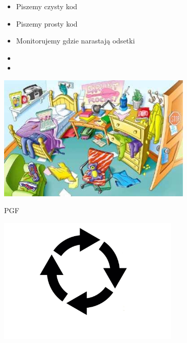 \documentclass{beamer}
\begin{document}
\begin{frame}{}
     \begin{Large}
	\begin{itemize}
		\item Piszemy czysty kod
		\item Piszemy prosty kod
		\item Monitorujemy gdzie narastają odsetki
		\item 
		\item 
	\end{itemize}
     \end{Large}
\end{frame}

\begin{frame}{}
\begin{center}
  	\includegraphics[height=6cm]{mess.jpeg}
\end{center}
\end{frame}

\begin{frame}{}
\begin{center}
\Huge{PGF}
\end{center}
\end{frame}

\begin{frame}{}
\begin{center}
  	\includegraphics[height=6cm]{pgf1.jpg}
\end{center}
\end{frame}
\end{document}
